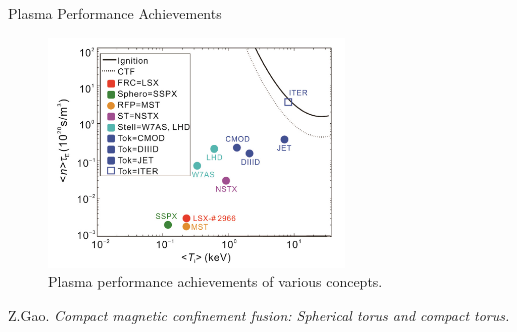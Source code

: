 \begin{frame} {Plasma Performance Achievements}
    \begin{figure}
        \centering
        \includegraphics[width=0.7\textwidth]{figures/plasma-performance.png}
        \caption{Plasma performance achievements of various concepts. \cite{gao_2016_compact}}
        \label{fig:plasma-performance}
    \end{figure}

    \tiny \cite{gao_2016_compact} Z.Gao. \textit{Compact magnetic confinement fusion: Spherical torus and compact torus.}
\end{frame}